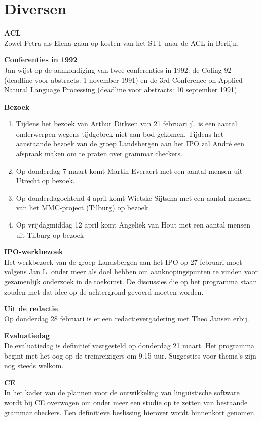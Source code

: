 \section{Diversen}
\begin{description}
\item {\bf ACL}\\
Zowel Petra als Elena gaan op kosten van het STT naar de ACL in Berlijn.

\item {\bf Conferenties in 1992}\\
Jan wijst op de aankondiging van twee conferenties in 1992: de Coling-92 
(deadline voor abstracts: 1 november 1991) en de 
3rd Conference on Applied Natural Language Processing
(deadline voor abstracts: 10 september 1991).

\item {\bf Bezoek}

\begin{enumerate}
  \item Tijdens het bezoek van Arthur Dirksen van 21 februari jl. is een aantal 
onderwerpen wegens tijdgebrek niet aan bod gekomen. 
Tijdens het aanstaande bezoek van de groep Landsbergen aan het IPO zal
Andr\'{e} een afspraak maken om te praten over grammar checkers.
  \item Op donderdag 7 maart  komt Martin Everaert met een aantal mensen uit 
Utrecht op bezoek. 
  \item Op donderdagochtend  
4 april komt Wietske Sijtsma met een aantal mensen van het MMC-project  
(Tilburg) op bezoek. 
  \item 
Op vrijdagmiddag 12 april komt Angeliek van Hout met een aantal mensen uit 
Tilburg op bezoek
\end{enumerate}

\item {\bf IPO-werkbezoek}\\
Het werkbezoek van de groep Landsbergen aan het IPO op 27 februari moet volgens 
Jan L. onder meer 
als doel hebben om aanknopingspunten te vinden voor gezamenlijk onderzoek 
in de toekomst. De discussies die op het programma staan zouden  
met dat idee op de achtergrond gevoerd moeten worden.

\item {\bf Uit de redactie}\\
Op donderdag 28 februari is er een redactievergadering met Theo Jansen erbij. 
\item {\bf Evaluatiedag}\\
De evaluatiedag is definitief vastgesteld op donderdag 21 maart. Het programma 
begint 
met het oog op de treinreizigers
om 9.15 uur. Suggesties voor thema's zijn nog steeds welkom. 
\item {\bf CE}\\
In het kader van de plannen voor de ontwikkeling van 
lingu\"{\i}stische software wordt bij CE overwogen om onder meer 
een studie op te zetten
van bestaande grammar checkers. 
Een definitieve beslissing hierover wordt binnenkort
genomen. 


\end{description}
